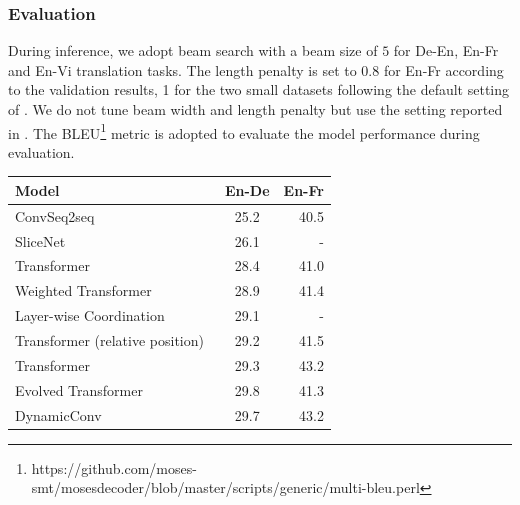 \documentclass{article} %
\begin{document}
\subsubsection{Evaluation}
During inference, we adopt beam search with a beam size of $5$ for De-En, En-Fr and  En-Vi translation tasks. The length penalty is set to 0.8 for En-Fr according to  the validation results, 1 for the two small datasets following the default setting of \cite{ott2019fairseq}. We do not tune beam width and length penalty but use the setting reported in \citet{vaswani2017attention}.
The BLEU\footnote{https://github.com/moses-smt/mosesdecoder/blob/master/scripts/generic/multi-bleu.perl} metric is adopted to evaluate the model performance during evaluation. 

\begin{table}
\centering
\begin{tabular}{lcr}
\toprule
Model   & En-De & En-Fr \\
\midrule
ConvSeq2seq~\citep{gehring2017convolutional}  & 25.2  & 40.5 \\
SliceNet~\citep{kaiser2017depthwise} & 26.1 &- \\
Transformer~\citep{vaswani2017attention}  &28.4  & 41.0 \\
Weighted Transformer~\citep{ahmed2017weighted}  & 28.9 & 41.4 \\
Layer-wise Coordination~\citep{NIPS2018_8019}  & 29.1 & - \\
Transformer (relative position)~\citep{Shaw_2018}   & 29.2 & 41.5 \\
Transformer~\citep{ott2018scaling} & 29.3 & 43.2 \\
Evolved Transformer~\citep{so2019evolved} &  29.8 & 41.3 \\
DynamicConv~\citep{wu2019pay}  & 29.7 & 43.2 \\


\end{tabular}
\end{table}
\end{document}
